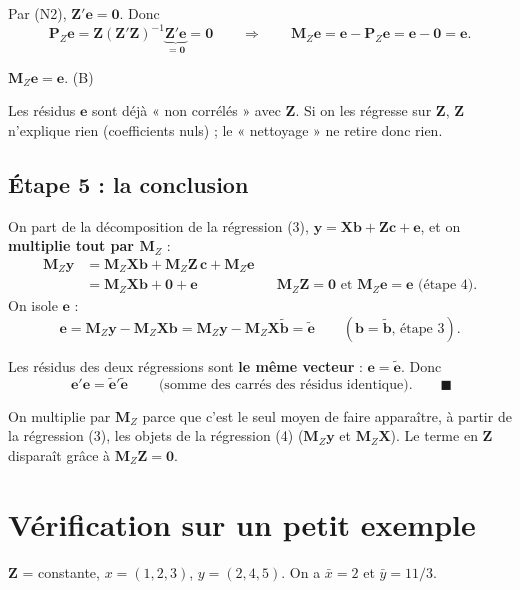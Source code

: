 \documentclass[11pt,a4paper]{article}
\newcommand{\vy}{\mathbf{y}}\newcommand{\vX}{\mathbf{X}}\newcommand{\vZ}{\mathbf{Z}}
\newcommand{\ve}{\mathbf{e}}\newcommand{\vb}{\mathbf{b}}\newcommand{\vc}{\mathbf{c}}
\newcommand{\Mz}{\mathbf{M}_Z}\newcommand{\Pz}{\mathbf{P}_Z}
\begin{document}
Par (N2), $\vZ'\ve=\mathbf 0$. Donc
\[
\Pz\ve=\vZ(\vZ'\vZ)^{-1}\underbrace{\vZ'\ve}_{=\mathbf 0}=\mathbf 0
\qquad\Longrightarrow\qquad
\Mz\ve=\ve-\Pz\ve=\ve-\mathbf 0=\ve .
\]

\begin{resultat}
$\Mz\ve=\ve$. \hfill (B) \checkmark
\end{resultat}

\begin{pourquoi}
Les résidus $\ve$ sont déjà « non corrélés » avec $\vZ$. Si on les régresse sur $\vZ$, $\vZ$ n'explique rien (coefficients nuls) ; le « nettoyage » ne retire donc rien.
\end{pourquoi}

\subsection*{Étape 5 : la conclusion}

On part de la décomposition de la régression (3), $\vy=\vX\vb+\vZ\vc+\ve$, et on \textbf{multiplie tout par $\Mz$} :
\begin{align*}
\Mz\vy&=\Mz\vX\vb+\Mz\vZ\,\vc+\Mz\ve\\
&=\Mz\vX\vb+\mathbf 0+\ve && \Mz\vZ=\mathbf 0 \text{ et } \Mz\ve=\ve \text{ (étape 4)} .
\end{align*}
On isole $\ve$ :
\[
\ve=\Mz\vy-\Mz\vX\vb=\Mz\vy-\Mz\vX\tilde{\vb}=\tilde{\ve}\qquad(\vb=\tilde{\vb}\text{, étape 3}).
\]

\begin{resultat}
Les résidus des deux régressions sont \textbf{le même vecteur} : $\ve=\tilde{\ve}$. Donc
\[
\boxed{\ \ve'\ve=\tilde{\ve}'\tilde{\ve}\ }\qquad\text{(somme des carrés des résidus identique).}\qquad\blacksquare
\]
\end{resultat}

\begin{pourquoi}
On multiplie par $\Mz$ parce que c'est le seul moyen de faire apparaître, à partir de la régression (3), les objets de la régression (4) ($\Mz\vy$ et $\Mz\vX$). Le terme en $\vZ$ disparaît grâce à $\Mz\vZ=\mathbf 0$.
\end{pourquoi}

\section{Vérification sur un petit exemple}\label{sec:exemple}

$\vZ$ = constante, $x=(1,2,3)$, $y=(2,4,5)$. On a $\bar x=2$ et $\bar y=11/3$.
\end{document}
